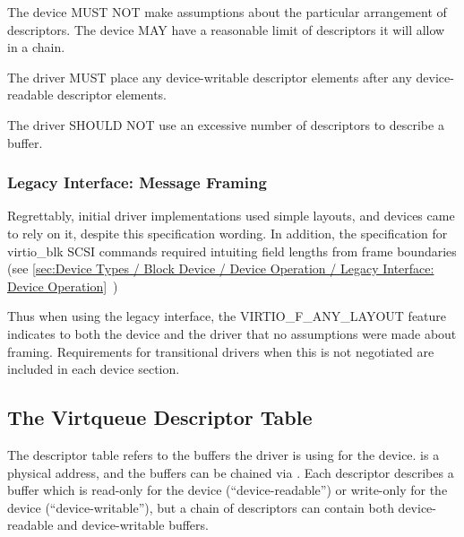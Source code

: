 The device MUST NOT make assumptions about the particular arrangement
of descriptors.  The device MAY have a reasonable limit of descriptors
it will allow in a chain.

The driver MUST place any device-writable descriptor elements after
any device-readable descriptor elements.

The driver SHOULD NOT use an excessive number of descriptors to
describe a buffer.

\subsubsection{Legacy Interface: Message Framing}\label{sec:Basic Facilities of a Virtio Device / Virtqueues / Message Framing / Legacy Interface: Message Framing}

Regrettably, initial driver implementations used simple layouts, and
devices came to rely on it, despite this specification wording.  In
addition, the specification for virtio_blk SCSI commands required
intuiting field lengths from frame boundaries (see
 \ref{sec:Device Types / Block Device / Device Operation / Legacy Interface: Device Operation}~)

Thus when using the legacy interface, the VIRTIO_F_ANY_LAYOUT
feature indicates to both the device and the driver that no
assumptions were made about framing.  Requirements for
transitional drivers when this is not negotiated are included in
each device section.

\subsection{The Virtqueue Descriptor Table}\label{sec:Basic Facilities of a Virtio Device / Virtqueues / The Virtqueue Descriptor Table}

The descriptor table refers to the buffers the driver is using for
the device.  is a physical address, and the buffers
can be chained via . Each descriptor describes a
buffer which is read-only for the device (``device-readable'') or write-only for the device (``device-writable''), but a chain of
descriptors can contain both device-readable and device-writable buffers.


